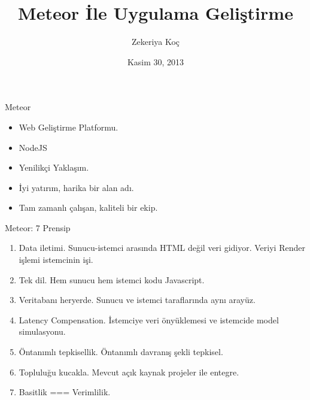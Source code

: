 \documentclass{beamer}
\title[Meteor 101]{Meteor \.{I}le Uygulama Geli\c{s}tirme}
\author{Zekeriya Ko\c{c}}
\institute{Metglobal}
\date{Kasim 30, 2013}
\begin{document}
    \begin{frame}
        \titlepage{}
    \end{frame}

    \begin{frame}{Meteor}
        \begin{itemize}
            \item Web Geliştirme Platformu.
            \item NodeJS
            \item Yenilikçi Yaklaşım.
            \item İyi yatırım, harika bir alan adı.
            \item Tam zamanlı çalışan, kaliteli bir ekip.
        \end{itemize}
    \end{frame}

    \begin{frame}{Meteor: 7 Prensip}
        \begin{enumerate}
            \item Data iletimi. Sunucu-istemci arasında HTML değil veri gidiyor. Veriyi Render işlemi istemcinin işi.
            \item Tek dil. Hem sunucu hem istemci kodu Javascript.
            \item Veritabanı heryerde. Sunucu ve istemci taraflarında aynı arayüz.
            \item Latency Compensation. İstemciye veri önyüklemesi ve istemcide model simulasyonu.
            \item Öntanımlı tepkisellik. Öntanımlı davranış şekli tepkisel. 
            \item Topluluğu kucakla. Mevcut açık kaynak projeler ile entegre.
            \item Basitlik === Verimlilik.
        \end{enumerate}
    \end{frame}
\end{document}
